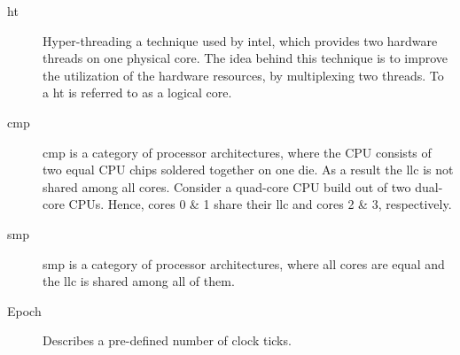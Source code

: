 \begin{description}
  \item[\Gls{ht}] Hyper-threading a technique used by \gls{intel}, which provides
    two hardware threads on one physical core.
    The idea behind this technique is to improve the utilization of the
    hardware resources, by multiplexing two threads.
    To a \Gls{ht} is referred to as a logical core.

  \item[\Gls{cmp}] \gls{cmp} is a category of processor architectures, where
    the CPU consists of two equal CPU chips soldered together on one die.
    As a result the \gls{llc} is not shared among all cores.
    Consider a quad-core CPU build out of two dual-core CPUs.
    Hence, cores 0 \& 1 share their \gls{llc} and cores 2 \& 3, respectively.

  \item[\Gls{smp}] \gls{smp} is a category of processor architectures, where
    all cores are equal and the \gls{llc} is shared among all of them.

  \item[Epoch] Describes a pre-defined number of clock ticks.

\end{description}
